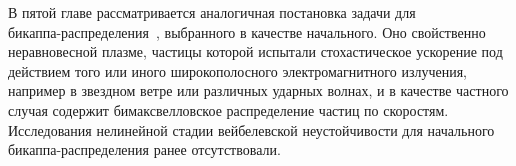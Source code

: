 В пятой главе рассматривается аналогичная постановка задачи для\\ бикаппа-распределения~\cite{Livadiotis2017, Livadiotis2021}, выбранного в качестве начального. Оно свойственно неравновесной плазме, частицы которой испытали стохастическое ускорение под действием того или иного широкополосного электромагнитного излучения, например в звездном ветре или различных ударных волнах, и в качестве частного случая содержит бимаксвелловское распределение частиц по скоростям. Исследования нелинейной стадии вейбелевской неустойчивости для начального бикаппа-распределения ранее отсутствовали.



